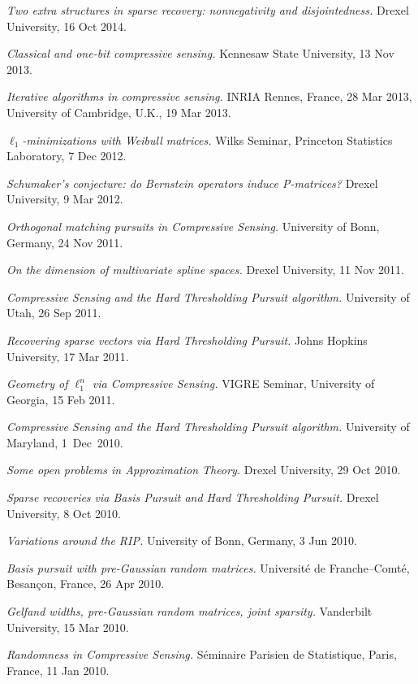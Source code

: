 \documentclass[11pt]{article}
\begin{document}
\item {\sl Two extra structures in sparse recovery: nonnegativity and disjointedness.} Drexel University, 16 Oct 2014.
\item {\sl Classical and one-bit compressive sensing.} 
Kennesaw State University, 13 Nov 2013.
\item {\sl Iterative algorithms in compressive sensing.} INRIA Rennes, France, 28 Mar 2013,
University of Cambridge, U.K., 19 Mar 2013. 
\item {\sl $\ell_1$-minimizations with Weibull matrices.} Wilks Seminar, Princeton Statistics Laboratory, 7 Dec 2012.
\item {\sl Schumaker's conjecture: do Bernstein operators induce P-matrices?} Drexel University, 9 Mar 2012.
\item {\sl Orthogonal matching pursuits in Compressive Sensing.} University of Bonn, Germany, 24 Nov 2011.
\item {\sl On the dimension of multivariate spline spaces.} Drexel University, 11 Nov 2011.
\item {\sl Compressive Sensing and the Hard Thresholding Pursuit algorithm.} University of Utah, 26 Sep 2011.
\item {\sl Recovering sparse vectors via Hard Thresholding Pursuit.} Johns Hopkins University, 17 Mar 2011.
\item {\sl Geometry of $\ell_1^n$ via Compressive Sensing.} VIGRE Seminar, University of Georgia, 15 Feb 2011.
\item {\sl Compressive Sensing and the Hard Thresholding Pursuit algorithm.\hspace{-1.5mm}}  University of Maryland, 1~Dec~2010.
\item {\sl Some open problems in Approximation Theory.} Drexel University, 29 Oct 2010.
\item {\sl Sparse recoveries via Basis Pursuit and Hard Thresholding Pursuit.} Drexel University, 8 Oct 2010.
\item {\sl Variations around the RIP.} University of Bonn, Germany, 3 Jun 2010.
\item {\sl Basis pursuit with pre-Gaussian random matrices.} 
Universit\'e de Franche--Comt\'e, Besan\c{c}on, France, 26 Apr 2010.
\item {\sl Gelfand widths, pre-Gaussian random matrices, joint sparsity.} Vanderbilt University, 15 Mar 2010.
\item {\sl Randomness in Compressive Sensing.} S\'eminaire Parisien de Statistique, Paris, France, 11 Jan 2010.
\end{document}
